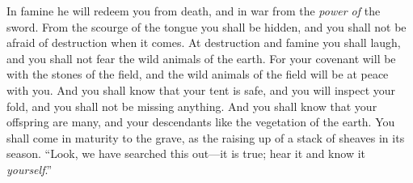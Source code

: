 \begin{biblechapter}
\verse In famine he will redeem you from death, 
and in war from the \textit{power of} the sword.
\verse From the scourge of the tongue you shall be hidden, 
and you shall not be afraid of destruction when it comes.
\verse At destruction and famine you shall laugh, 
and you shall not fear the wild animals of the earth.
\verse For your covenant will be with the stones of the field, 
and the wild animals of the field will be at peace with you.
\verse And you shall know that your tent is safe, 
and you will inspect your fold, and you shall not be missing anything.
\verse And you shall know that your offspring are many, 
and your descendants like the vegetation of the earth.
\verse You shall come in maturity to the grave, 
as the raising up of a stack of sheaves in its season.
\verse “Look, we have searched this out—it is true; 
hear it and know it \textit{yourself}.”
\end{biblechapter}

